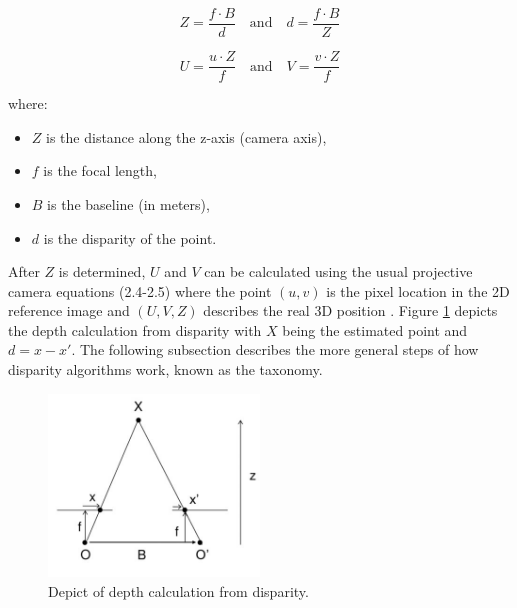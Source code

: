 \begin{equation}
  Z = \frac{f \cdot B}{d}\quad \textrm{and}\quad d = \frac{f \cdot B}{Z}
\end{equation}

\begin{equation}
  U = \frac{u \cdot Z}{f}\quad \textrm{and}\quad V = \frac{v \cdot Z}{f}
\end{equation}

where:

\begin{itemize}
  \item $Z$ is the distance along the z-axis (camera axis),
  \item $f$ is the focal length,
  \item $B$ is the baseline (in meters),
  \item $d$ is the disparity of the point.
\end{itemize}

\noindent After $Z$ is determined, $U$ and $V$ can be calculated using the usual projective camera equations (2.4-2.5) where the point $(u,v)$ is the pixel location in the 2D reference image and $(U,V,Z)$ describes the real 3D position \citep{scharstein2002taxonomy, cyganek2011introduction, block20133d, martull2012realistic}.
Figure \ref{fig:depth-estimation} depicts the depth calculation from disparity with $X$ being the estimated point and $d = x - x'$.
\newline\newline\noindent The following subsection describes the more general steps of how disparity algorithms work, known as the taxonomy.

\begin{figure}[h!]
  \centering
  \includegraphics[width=0.5\textwidth]{src/images/depth-calculation.png}
  \caption[Depict of depth calculation from disparity.]{Depict of depth calculation from disparity.\protect\footnotemark}
  \label{fig:depth-estimation}
\end{figure}

